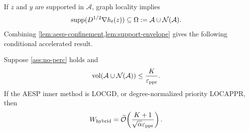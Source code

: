 If $z$ and $y$ are supported in $\mathcal A$, graph locality implies
\begin{equation}
  \operatorname{supp}(D^{1/2}\nabla h_t(z))
  \subseteq
  \Omega:=\mathcal A\cup\mathcal N(\mathcal A).
  \label{eq:gradient-envelope}
\end{equation}
Combining \cref{lem:aesp-confinement,lem:support-envelope} gives the following
conditional accelerated result.

\begin{corollary}
\label{cor:confinement-total}
Suppose \cref{ass:no-perc} holds and
\begin{equation}
  \operatorname{vol}\!\left(\mathcal A\cup\mathcal N(\mathcal A)\right)
  \leq\frac{K}{\varepsilon_{\mathrm{ppr}}}.
  \label{eq:envelope-volume-condition}
\end{equation}
If the AESP inner method is LOCGD, or degree-normalized priority LOCAPPR, then
\begin{equation}
  W_{\rm hybrid}
  =\widetilde{\mathcal{O}}\!\left(\frac{K+1}{\sqrt\alpha\varepsilon_{\mathrm{ppr}}}\right).
  \label{eq:confinement-total}
\end{equation}
\end{corollary}
